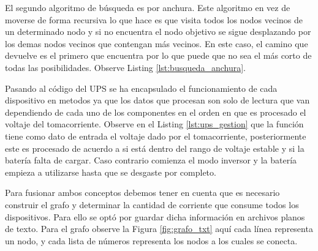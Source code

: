 \documentclass[runningheads]{llncs}
\begin{document}
        El segundo algoritmo de búsqueda es por anchura. Este algoritmo en vez de moverse de forma recursiva lo que hace es que visita todos los nodos vecinos de un determinado nodo y si no encuentra el nodo objetivo se sigue desplazando por los demas nodos vecinos que contengan más vecinos. En este caso, el camino que devuelve es el primero que encuentra por lo que puede que no sea el más corto de todas las posibilidades. Observe Listing \ref{lst:busqueda_anchura}.
        
        

        Pasando al código del UPS se ha encapsulado el funcionamiento de cada dispositivo en metodos ya que los datos que procesan son solo de lectura que van dependiendo de cada uno de los componentes en el orden en que es procesado el voltaje del tomacorriente. Observe en el Listing \ref{lst:ups_gestion} que la función tiene como dato de entrada el voltaje dado por el tomacorriente, posteriormente este es procesado de acuerdo a si está dentro del rango de voltaje estable y si la batería falta de cargar. Caso contrario comienza el modo inversor y la batería empieza a utilizarse hasta que se desgaste por completo.

        

        Para fusionar ambos conceptos debemos tener en cuenta que es necesario construir el grafo y determinar la cantidad de corriente que consume todos los dispositivos. Para ello se optó por guardar dicha información en archivos planos de texto. Para el grafo observe la Figura \ref{fig:grafo_txt} aquí cada línea representa un nodo, y cada lista de números representa los nodos a los cuales se conecta.
        
\end{document}

